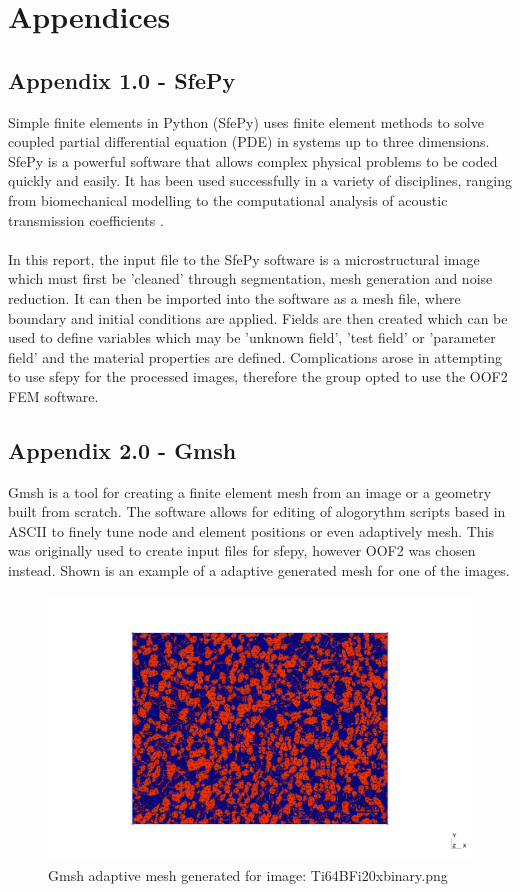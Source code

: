 \documentclass[\report.tex]{subfiles}
\begin{document}
\section{Appendices}

\subsection{Appendix 1.0 - SfePy}
Simple finite elements in Python (SfePy) uses finite element methods to solve coupled partial differential equation (PDE) in systems up to three dimensions. SfePy is a powerful software that allows complex physical problems to be coded quickly and easily. It has been used successfully in a variety of disciplines, ranging from biomechanical modelling \cite{biomedapplication} to the computational analysis of acoustic transmission coefficients \cite{AcousticTransmission}.\\ \\In this report, the input file to the SfePy software is a microstructural image which must first be 'cleaned' through segmentation, mesh generation and noise reduction. It can then be imported into the software as a mesh file, where boundary and initial conditions are applied. Fields are then created which can be used to define variables which may be 'unknown field', 'test field' or 'parameter field' \cite{FEMinSfePy} and the material properties are defined. Complications arose in attempting to use sfepy for the processed images, therefore the group opted to use the OOF2 FEM software.


\subsection{Appendix 2.0 - Gmsh}
Gmsh is a tool for creating a finite element mesh from an image or a geometry built from scratch. The software allows for editing of alogorythm scripts based in ASCII to finely tune node and element positions or even adaptively mesh. This was originally used to create input files for sfepy, however OOF2 was chosen instead. Shown is an example of a adaptive generated mesh for one of the images.
\begin{figure}[h!]
    \centering
    \includegraphics[width=17cm]{Images/out.png}
    \caption{Gmsh adaptive mesh generated for image: Ti64BFi20xbinary.png}
    \label{fig:gmsh}
\end{figure}
\end{document}

